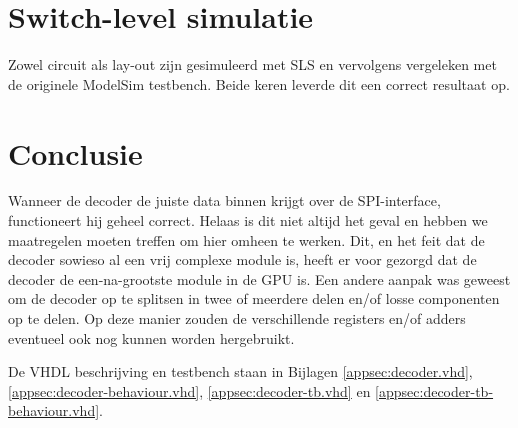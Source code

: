\documentclass{scrartcl} %
\begin{document}
\section{Switch-level simulatie}
Zowel circuit als lay-out zijn gesimuleerd met SLS en vervolgens vergeleken met de originele ModelSim testbench. Beide keren leverde dit een correct resultaat op.

\section{Conclusie}
Wanneer de decoder de juiste data binnen krijgt over de SPI-interface, functioneert hij geheel correct. Helaas is dit niet altijd het geval en hebben we maatregelen moeten treffen om hier omheen te werken. Dit, en het feit dat de decoder sowieso al een vrij complexe module is, heeft er voor gezorgd dat de decoder de een-na-grootste module in de GPU is. Een andere aanpak was geweest om de decoder op te splitsen in twee of meerdere delen en/of losse componenten op te delen. Op deze manier zouden de verschillende registers en/of adders eventueel ook nog kunnen worden hergebruikt.

De VHDL beschrijving en testbench staan in Bijlagen \ref{appsec:decoder.vhd}, \ref{appsec:decoder-behaviour.vhd}, \ref{appsec:decoder-tb.vhd} en \ref{appsec:decoder-tb-behaviour.vhd}.
\end{document}
